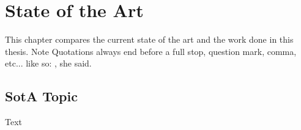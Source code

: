 \documentclass[class=scrbook, crop=false]{standalone}
\begin{document}
\chapter{State of the Art}
\label{Chapter::State_of_the_Art} %
    This chapter compares the current state of the art and the work done in this thesis.
    Note Quotations always end before a full stop, question mark, comma, etc... like so: , she said.

\section{SotA Topic}
\label{Section::SotA_Topic}
    Text
\end{document}
